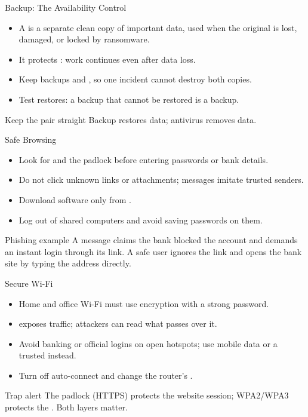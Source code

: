 \documentclass[aspectratio=169]{beamer}
\begin{document}
\begin{frame}{Backup: The Availability Control}
  \begin{itemize}
    \item A  is a separate clean copy of important data, used
      when the original is lost, damaged, or locked by ransomware.
    \item It protects : work continues even after data loss.
    \item Keep backups  and , so one
      incident cannot destroy both copies.
    \item Test restores: a backup that cannot be restored is  a
      backup.
  \end{itemize}
  \begin{block}{Keep the pair straight}
    Backup restores  data; antivirus removes  data.
  \end{block}
\end{frame}

\begin{frame}{Safe Browsing}
  \begin{itemize}
    \item Look for  and the padlock before entering passwords or
      bank details.
    \item Do not click unknown links or attachments;  messages
      imitate trusted senders.
    \item Download software only from .
    \item Log out of shared computers and avoid saving passwords on them.
  \end{itemize}
  \begin{exampleblock}{Phishing example}
    A message claims the bank blocked the account and demands an instant
    login through its link. A safe user ignores the link and opens the bank
    site by typing the address directly.
  \end{exampleblock}
\end{frame}

\begin{frame}{Secure Wi-Fi}
  \begin{itemize}
    \item Home and office Wi-Fi must use  encryption with a
      strong password.
    \item {} exposes traffic; attackers
      can read what passes over it.
    \item Avoid banking or official logins on open hotspots; use mobile data
      or a trusted  instead.
    \item Turn off auto-connect and change the router's .
  \end{itemize}
  \begin{alertblock}{Trap alert}
    The padlock (HTTPS) protects the website session; WPA2/WPA3 protects the
    . Both layers matter.
  \end{alertblock}
\end{frame}
\end{document}
